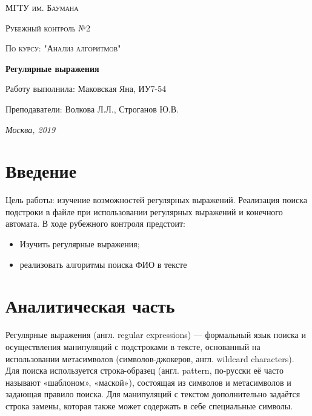 \documentclass[12pt]{report}
\begin{document}
\begin{titlepage}
	\centering
	{\scshape\LARGE МГТУ им. Баумана \par}
	\vspace{3cm}
	{\scshape\Large Рубежный контроль №2\par}
	\vspace{0.5cm}	
	{\scshape\Large По курсу: "Анализ алгоритмов"\par}
	\vspace{1.5cm}
	{\huge\bfseries Регулярные выражения \par}
	\vspace{2cm}
	\Large Работу выполнила: Маковская Яна, ИУ7-54\par
	\vspace{0.5cm}
	\Large Преподаватели:  Волкова Л.Л., Строганов Ю.В.\par

	\vfill
	\large \textit {Москва, 2019} \par
\end{titlepage}

\tableofcontents

\newpage
\chapter*{Введение}

Цель работы: изучение возможностей регулярных выражений. Реализация поиска подстроки в файле при использовании регулярных выражений и конечного автомата.
В ходе рубежного контроля предстоит:
\begin{itemize}
	\item Изучить регулярные выражения; 
	\item реализовать алгоритмы поиска ФИО в тексте
\end{itemize}

\chapter{Аналитическая часть}
Регулярные выражения (англ. regular expressions) — формальный язык поиска и осуществления манипуляций с подстроками в тексте, основанный на использовании метасимволов (символов-джокеров, англ. wildcard characters). Для поиска используется строка-образец (англ. pattern, по-русски её часто называют «шаблоном», «маской»), состоящая из символов и метасимволов и задающая правило поиска. Для манипуляций с текстом дополнительно задаётся строка замены, которая также может содержать в себе специальные символы.
\end{document}
